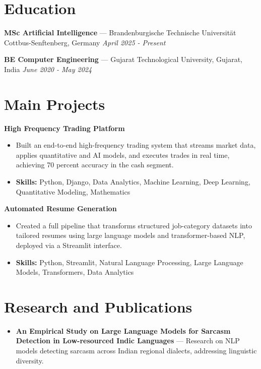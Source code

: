 \documentclass[a4paper,10pt]{article}
\begin{document}
\section*{Education}
\textbf{MSc Artificial Intelligence} — Brandenburgische Technische Universität Cottbus-Senftenberg, Germany \hfill \textit{April 2025 - Present}\par
\vspace{1.5pt}
\textbf{BE Computer Engineering} — Gujarat Technological University, Gujarat, India \hfill \textit{June 2020 - May 2024}\par

\section*{Main Projects}
\textbf{High Frequency Trading Platform}\par
\vspace{1pt}
\begin{itemize}
  \item Built an end-to-end high-frequency trading system that streams market data, applies quantitative and AI models, and executes trades in real time, achieving 70 percent accuracy in the cash segment.
  \item \textbf{Skills:} Python, Django, Data Analytics, Machine Learning, Deep Learning, Quantitative Modeling, Mathematics
\end{itemize}
\vspace{3pt}
\textbf{Automated Resume Generation}\par
\vspace{1pt}
\begin{itemize}
  \item Created a full pipeline that transforms structured job-category datasets into tailored resumes using large language models and transformer-based NLP, deployed via a Streamlit interface.
  \item \textbf{Skills:} Python, Streamlit, Natural Language Processing, Large Language Models, Transformers, Data Analytics
\end{itemize}

\section*{Research and Publications}
\begin{itemize}
\item \textbf{An Empirical Study on Large Language Models for Sarcasm Detection in Low-resourced Indic Languages} — Research on NLP models detecting sarcasm across Indian regional dialects, addressing linguistic diversity.
\end{itemize}
\end{document}
